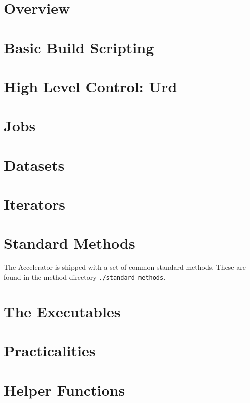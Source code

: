 \documentclass[a4paper]{book}
\begin{document}
\chapter{Overview}


\chapter{Basic Build Scripting}


\chapter{High Level Control:  Urd}


\chapter{Jobs}


\chapter{Datasets}


\chapter{Iterators}


\chapter{Standard Methods}
The Accelerator is shipped with a set of common standard methods.
These are found in the method directory \texttt{./standard\_methods}.


\chapter{The Executables}


\appendix

\chapter{Practicalities}


\chapter{Helper Functions}



\printindex



\end{document}
